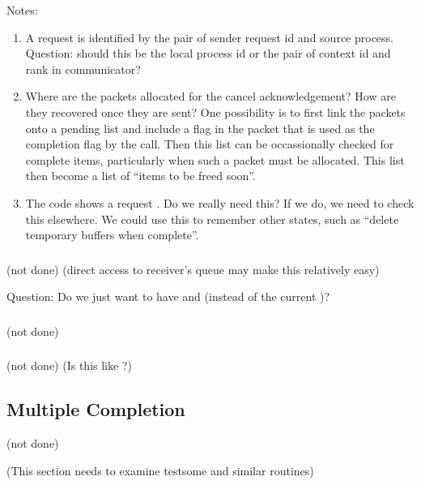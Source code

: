 Notes:
\begin{enumerate}
\item A request is identified by the pair of sender request id and
source process.  Question: should this be the local process id or the
pair of context id and rank in communicator?

\item Where are the packets allocated for the cancel acknowledgement?
How are they recovered once 
they are sent? One possibility is to first link the packets onto a
pending list and include a flag in the packet that is used as the
completion flag by the  call.  Then this list can
be occassionally checked for complete items, particularly when such a
packet must be allocated.  This list then become a list of ``items to
be freed soon''.

\item The code shows a request .  Do we really need this?
If we do, we need to check this elsewhere.  We could use this to
remember other states, such as ``delete temporary buffers when
complete''.

\end{enumerate}

\subsubsection{\shmemname}
(not done)
(direct access to receiver's queue may make this relatively easy)

Question: Do we just want to have 
and  (instead of the current
)? 

\subsubsection{\shmemallname}
(not done)

\subsubsection{\vianame}
(not done)
(Is this like \tcpname?)

\subsection{Multiple Completion}
(not done)

(This section needs to examine testsome and similar routines)

